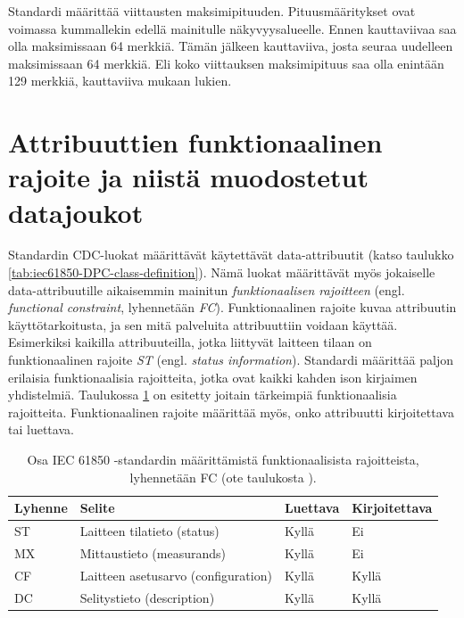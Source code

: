 Standardi määrittää viittausten maksimipituuden. Pituusmääritykset ovat voimassa kummallekin edellä mainitulle näkyvyysalueelle. Ennen kauttaviivaa saa olla maksimissaan 64 merkkiä. Tämän jälkeen kauttaviiva, josta seuraa uudelleen maksimissaan 64 merkkiä. Eli koko viittauksen maksimipituus saa olla enintään 129 merkkiä, kauttaviiva mukaan lukien. \mbox{\cite[s.~24,183]{IEC61850-7-2}}


\section{Attribuuttien funktionaalinen rajoite ja niistä muodostetut datajoukot}
\label{ch:fc-and-dataset}
Standardin CDC-luokat määrittävät käytettävät data-attribuutit (katso taulukko \ref{tab:iec61850-DPC-class-definition}). Nämä luokat määrittävät myös jokaiselle data-attribuutille aikaisemmin mainitun \emph{funktionaalisen rajoitteen} (engl. \emph{functional constraint}, lyhennetään \emph{FC}). Funktionaalinen rajoite kuvaa attribuutin käyttötarkoitusta, ja sen mitä palveluita attribuuttiin voidaan käyttää. Esimerkiksi kaikilla attribuuteilla, jotka liittyvät laitteen tilaan on funktionaalinen rajoite \emph{ST} (engl. \emph{status information}). Standardi määrittää paljon erilaisia funktionaalisia rajoitteita, jotka ovat kaikki kahden ison kirjaimen yhdistelmiä. Taulukossa \ref{tab:iec61850-functional-constraints} on esitetty joitain tärkeimpiä funktionaalisia rajoitteita. Funktionaalinen rajoite määrittää myös, onko attribuutti kirjoitettava tai luettava. \cite[s.~53--55]{IEC61850-7-2}

\begin{table}[ht!]
	\caption{Osa IEC 61850 -standardin määrittämistä funktionaalisista rajoitteista, lyhennetään FC (ote taulukosta \mbox{\cite[s.~54]{IEC61850-7-2}}).}
	\label{tab:iec61850-functional-constraints}
	\begin{tabular}{l | l | l | l}
		\hline
		\textbf{Lyhenne} & \textbf{Selite} & \textbf{Luettava} & \textbf{Kirjoitettava} \\
		\hline \hline
		ST & Laitteen tilatieto (status) & Kyllä & Ei \\
		MX & Mittaustieto (measurands) & Kyllä & Ei \\
		CF & Laitteen asetusarvo (configuration) & Kyllä & Kyllä \\
		DC & Selitystieto (description) & Kyllä & Kyllä \\
		\hline
	\end{tabular}
\end{table}

